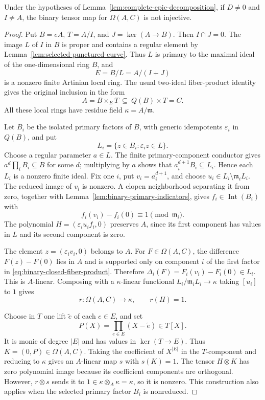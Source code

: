 \begin{lemma}
\label{lem:binary-proper-closed-fiber}
Under the hypotheses of Lemma~\ref{lem:complete-epic-decomposition},
if $D\ne0$ and $I\ne A$, the binary tensor map for $\Omega(A,C)$
is not injective.
\end{lemma}
\begin{proof}
Put $B=eA$, $T=A/I$, and $J=\ker(A\to B)$.  Then
$I\cap J=0$.  The image $L$ of $I$ in $B$ is proper and
contains a regular element by
Lemma~\ref{lem:selected-punctured-curve}.  Thus $L$ is primary
to the maximal ideal of the one-dimensional ring $B$, and
\[
 E=B/L=A/(I+J)
\]
is a nonzero finite Artinian local ring.  The usual two-ideal
fiber-product identity gives the original inclusion in the form
\begin{equation}\label{eq:binary-closed-fiber-product}
 A=B\times_E T\ \subseteq\ Q(B)\times T=C.                 
\end{equation}
All these local rings have residue field $\kappa=A/\mathfrak m$.

Let $B_i$ be the isolated primary factors of $B$, with generic
idempotents $\varepsilon_i$ in $Q(B)$, and put
\[
 L_i=\{z\in B_i:\varepsilon_i z\in L\}.
\]
Choose a regular parameter $a\in L$.  The finite
primary-component conductor gives
$a^d\prod_iB_i\subseteq B$ for some $d$; multiplying by $a$
shows that
$a_i^{d+1}B_i\subseteq L_i$.  Hence each $L_i$ is a nonzero
finite ideal.  Fix one $i$, put $v_i=a_i^{d+1}$, and choose
$u_i\in L_i\setminus\mathfrak m_iL_i$.
The reduced image of $v_i$ is nonzero.  A clopen neighborhood
separating it from zero, together with
Lemma~\ref{lem:binary-primary-indicators}, gives
$f_i\in\operatorname{Int}(B_i)$ with
\[
 f_i(v_i)-f_i(0)\equiv1\pmod{\mathfrak m_i}.
\]
The polynomial
$H=(\varepsilon_i u_i f_i,0)$ preserves $A$, since its first
component has values in $L$ and its second component is zero.

The element $z=(\varepsilon_i v_i,0)$ belongs to $A$.
For $F\in\Omega(A,C)$, the difference $F(z)-F(0)$ lies in $A$
and is supported only on component $i$ of the first factor
in \eqref{eq:binary-closed-fiber-product}.  Therefore
$\Delta_i(F)=F_i(v_i)-F_i(0)\in L_i$.
This is $A$-linear.  Composing with a $\kappa$-linear functional
$L_i/\mathfrak m_iL_i\to\kappa$ taking $[u_i]$ to $1$ gives
\[
 r:\Omega(A,C)\longrightarrow\kappa,\qquad r(H)=1.
\]

Choose in $T$ one lift $\widetilde e$ of each $e\in E$, and set
\[
 P(X)=\prod_{e\in E}(X-\widetilde e)\in T[X].
\]
It is monic of degree $|E|$ and has values in $\ker(T\to E)$.
Thus $K=(0,P)\in\Omega(A,C)$.
Taking the coefficient of $X^{|E|}$ in the $T$-component and
reducing to $\kappa$ gives an $A$-linear map $s$ with $s(K)=1$.
The tensor $H\otimes K$ has zero polynomial image because
its coefficient components are orthogonal.  However,
$r\otimes s$ sends it to
$1\in\kappa\otimes_A\kappa=\kappa$, so it is nonzero.
This construction also applies when the selected primary factor
$B_i$ is nonreduced.
\end{proof}

